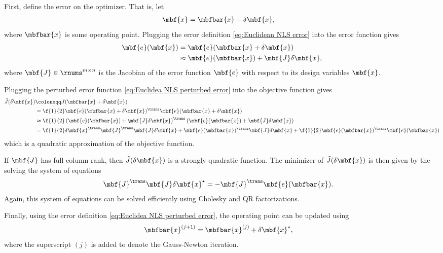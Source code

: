 \documentclass[ nobib, nofonts, notoc]{tufte-handout}
\begin{document}
    First, define the error on the optimizer. That is, let
    \begin{align}
        \label{eq:Euclidean NLS error}
        \mbf{x} &= \mbfbar{x} + \delta\mbf{x},
    \end{align}
    where $\mbfbar{x}$ is some operating point. Plugging the error definition \eqref{eq:Euclidean NLS error} into the error function gives
    \begin{align}
        \mbf{e}(\mbf{x}) &= \mbf{e}(\mbfbar{x} +\delta\mbf{x})\\
        \label{eq:Euclidea NLS perturbed error}
        &\approx \mbf{e}(\mbfbar{x}) + \mbf{J}\delta\mbf{x},
    \end{align}
    where $\mbf{J}\in\rnums^{m\times n}$ is the Jacobian of the error function $\mbf{e}$ with respect to its design variables $\mbf{x}$.

    Plugging the perturbed error function \eqref{eq:Euclidea NLS perturbed error} into the objective function gives
    \begin{align}
        \tilde{J}(\delta\mbf{x}) &\coloneqq J(\mbfbar{x} + \delta\mbf{x})\\
        &= \f{1}{2}\mbf{e}(\mbfbar{x} + \delta\mbf{x})^{\trans}\mbf{e}(\mbfbar{x} + \delta\mbf{x})\\
        &\approx
        \f{1}{2}\left( \mbf{e}(\mbfbar{x}) + \mbf{J}\delta\mbf{x} \right)^{\trans} \left( \mbf{e}(\mbfbar{x}) + \mbf{J}\delta\mbf{x} \right)\\
        &= \f{1}{2}\delta\mbf{x}^{\trans}\mbf{J}^{\trans}\mbf{J}\delta\mbf{x} + \mbf{e}(\mbfbar{x})^{\trans}\mbf{J}\delta\mbf{x} + \f{1}{2}\mbf{e}(\mbfbar{x})^{\trans}\mbf{e}(\mbfbar{x})
    \end{align}
    which is a quadratic approximation of the objective function.

    If $\mbf{J}$ has full column rank, then $\tilde{J}(\delta\mbf{x})$ is a strongly quadratic function. The minimizer of $\tilde{J}(\delta\mbf{x})$ is then given by the solving the system of equations
    \begin{align}
        \mbf{J}^{\trans}\mbf{J}\delta\mbf{x}^{\star} &= -\mbf{J}^{\trans}\mbf{e}(\mbfbar{x}).
    \end{align}
    Again, this system of equations can be solved efficiently using Cholesky and QR factorizations.

    Finally, using the error definition \eqref{eq:Euclidea NLS perturbed error}, the operating point can be updated using
    \begin{align}
        \mbfbar{x}^{(j+1)} &= \mbfbar{x}^{(j)} + \delta\mbf{x}^{\star},
    \end{align}
    where the superscript $(j)$ is added to denote the Gauss-Newton iteration.
\end{document}
